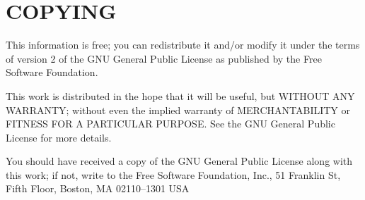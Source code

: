 \section{COPYING}


This information is free; you can redistribute it and/or modify
it under the terms of version 2 of the GNU General Public License as
published by the Free Software Foundation.

This work is distributed in the hope that it will be useful,
but WITHOUT ANY WARRANTY; without even the implied warranty of
MERCHANTABILITY or FITNESS FOR A PARTICULAR PURPOSE.  See the
GNU General Public License for more details.

You should have received a copy of the GNU General Public License
along with this work; if not, write to the Free Software
Foundation, Inc., 51 Franklin St, Fifth Floor, Boston, MA  02110--1301  USA
